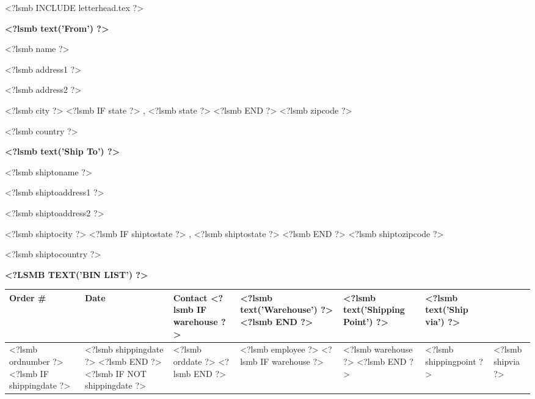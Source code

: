 \documentclass{scrartcl}
\begin{document}
\pagestyle{myheadings}
\thispagestyle{empty}

<?lsmb INCLUDE letterhead.tex ?>


%
%
%


\vspace*{0.5cm}

\parbox[t]{.5\textwidth}{
\textbf{<?lsmb text('From') ?>}
\vspace{0.3cm}

<?lsmb name ?>

<?lsmb address1 ?>

<?lsmb address2 ?>

<?lsmb city ?>
<?lsmb IF state ?>
\hspace{-0.1cm}, <?lsmb state ?>
<?lsmb END ?>
<?lsmb zipcode ?>

<?lsmb country ?>
}
\parbox[t]{.5\textwidth}{
\textbf{<?lsmb text('Ship To') ?>}
\vspace{0.3cm}

<?lsmb shiptoname ?>

<?lsmb shiptoaddress1 ?>

<?lsmb shiptoaddress2 ?>

<?lsmb shiptocity ?>
<?lsmb IF shiptostate ?>
\hspace{-0.1cm}, <?lsmb shiptostate ?>
<?lsmb END ?>
<?lsmb shiptozipcode ?>

<?lsmb shiptocountry ?>
}
\hfill

\vspace{1cm}

\textbf{\MakeUppercase{<?lsmb text('Bin List') ?>}}
\hfill

\vspace{1cm}

\begin{tabularx}{\textwidth}{*{6}{|X}|} \hline
  \textbf{Order \#} & \textbf{Date} & \textbf{Contact}
  <?lsmb IF warehouse ?>
  & \textbf{<?lsmb text('Warehouse') ?>}
  <?lsmb END ?>
  & \textbf{<?lsmb text('Shipping Point') ?>} & \textbf{<?lsmb text('Ship via') ?>} \\ [0.5em]
  \hline
  
  <?lsmb ordnumber ?>
  <?lsmb IF shippingdate ?>
  & <?lsmb shippingdate ?>
  <?lsmb END ?>
  <?lsmb IF NOT shippingdate ?>
  & <?lsmb orddate ?>
  <?lsmb END ?>
  & <?lsmb employee ?>
  <?lsmb IF warehouse ?>
  & <?lsmb warehouse ?>
  <?lsmb END ?>
  & <?lsmb shippingpoint ?> & <?lsmb shipvia ?> \\
  \hline
\end{tabularx}
  
\end{document}
